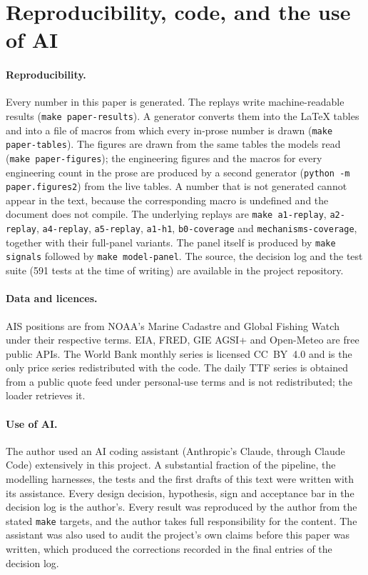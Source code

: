 \section{Reproducibility, code, and the use of AI}\label{app:repro}

\paragraph{Reproducibility.} Every number in this paper is generated. The replays
write machine-readable results (\texttt{make paper-results}). A generator converts
them into the LaTeX tables and into a file of macros from which every in-prose
number is drawn (\texttt{make paper-tables}). The figures are drawn from the same
tables the models read (\texttt{make paper-figures}); the engineering figures and
the macros for every engineering count in the prose are produced by a second
generator (\texttt{python -m paper.figures2}) from the live tables. A number that is not generated
cannot appear in the text, because the corresponding macro is undefined and the
document does not compile. The underlying replays are \texttt{make a1-replay},
\texttt{a2-replay}, \texttt{a4-replay}, \texttt{a5-replay}, \texttt{a1-h1},
\texttt{b0-coverage} and \texttt{mechanisms-coverage}, together with their
full-panel variants. The panel itself is produced by \texttt{make signals} followed
by \texttt{make model-panel}. The source, the decision log and the test suite (591
tests at the time of writing) are available in the project repository.

\paragraph{Data and licences.} AIS positions are from NOAA's Marine Cadastre and
Global Fishing Watch under their respective terms. EIA, FRED, GIE AGSI+ and
Open-Meteo are free public APIs. The World Bank monthly series is licensed CC~BY~4.0
and is the only price series redistributed with the code. The daily TTF series is
obtained from a public quote feed under personal-use terms and is not redistributed;
the loader retrieves it.

\paragraph{Use of AI.} The author used an AI coding assistant (Anthropic's Claude,
through Claude Code) extensively in this project. A substantial fraction of the
pipeline, the modelling harnesses, the tests and the first drafts of this text were
written with its assistance. Every design decision, hypothesis, sign and acceptance
bar in the decision log is the author's. Every result was reproduced by the author
from the stated \texttt{make} targets, and the author takes full responsibility for
the content. The assistant was also used to audit the project's own claims before
this paper was written, which produced the corrections recorded in the final entries
of the decision log. %
